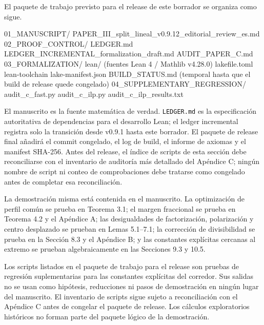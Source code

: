 \documentclass[
  11pt,
]{article}
\newenvironment{Shaded}{}{}
\newcommand{\NormalTok}[1]{#1}
\begin{document}
El paquete de trabajo previsto para el release de este borrador se organiza como sigue.

\begin{Shaded}
\begin{Highlighting}[]
\NormalTok{01\_MANUSCRIPT/}
\NormalTok{    PAPER\_III\_split\_lineal\_v0.9.12\_editorial\_review\_es.md}
\NormalTok{02\_PROOF\_CONTROL/}
\NormalTok{    LEDGER.md}
\NormalTok{    LEDGER\_INCREMENTAL\_formalization\_draft.md}
\NormalTok{    AUDIT\_PAPER\_C.md}
\NormalTok{03\_FORMALIZATION/}
\NormalTok{    lean/                         (fuentes Lean 4 / Mathlib v4.28.0)}
\NormalTok{    lakefile.toml}
\NormalTok{    lean{-}toolchain}
\NormalTok{    lake{-}manifest.json}
\NormalTok{    BUILD\_STATUS.md               (temporal hasta que el build de release quede congelado)}
\NormalTok{04\_SUPPLEMENTARY\_REGRESSION/}
\NormalTok{    audit\_c\_fast.py}
\NormalTok{    audit\_c\_ilp.py}
\NormalTok{    audit\_c\_ilp\_results.txt}
\end{Highlighting}
\end{Shaded}

El manuscrito es la fuente matemática de verdad. \texttt{LEDGER.md} es la especificación autoritativa de dependencias para el desarrollo Lean; el ledger incremental registra solo la transición desde v0.9.1 hasta este borrador. El paquete de release final añadirá el commit congelado, el log de build, el informe de axiomas y el manifest SHA-256. Antes del release, el índice de scripts de esta sección debe reconciliarse con el inventario de auditoría más detallado del Apéndice C; ningún nombre de script ni conteo de comprobaciones debe tratarse como congelado antes de completar esa reconciliación.

La demostración misma está contenida en el manuscrito. La optimización de perfil común se prueba en Teorema 3.1; el margen fraccional se prueba en Teorema 4.2 y el Apéndice A; las desigualdades de factorización, polarización y centro desplazado se prueban en Lemas 5.1--7.1; la corrección de divisibilidad se prueba en la Sección 8.3 y el Apéndice B; y las constantes explícitas cercanas al extremo se prueban algebraicamente en las Secciones 9.3 y 10.5.

Los scripts listados en el paquete de trabajo para el release son pruebas de regresión suplementarias para las constantes explícitas del corredor. Sus salidas no se usan como hipótesis, reducciones ni pasos de demostración en ningún lugar del manuscrito. El inventario de scripts sigue sujeto a reconciliación con el Apéndice C antes de congelar el paquete de release. Los cálculos exploratorios históricos no forman parte del paquete lógico de la demostración.
\end{document}
